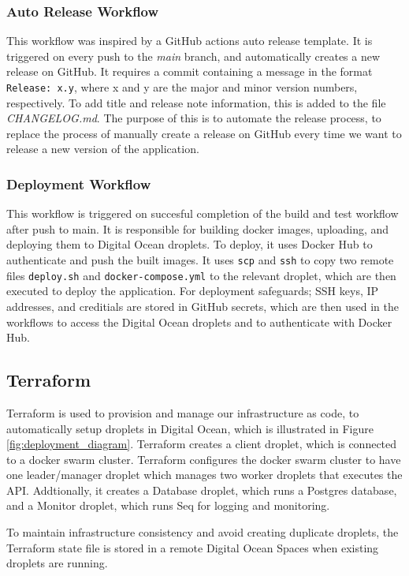 \subsubsection{Auto Release Workflow}
This workflow was inspired by a GitHub actions auto release template\cite{auto-release}.
It is triggered on every push to the \textit{main} branch, and automatically creates a new release on GitHub.
It requires a commit containing a message in the format \texttt{Release: x.y}, where x and y are the major and minor version numbers, respectively.
To add title and release note information, this is added to the file \textit{CHANGELOG.md}.
The purpose of this is to automate the release process, to replace the process of manually create a release on GitHub every time 
we want to release a new version of the application.

\subsubsection{Deployment Workflow}
This workflow is triggered on succesful completion of the build and test workflow after push to main.
It is responsible for building docker images, uploading, and deploying them to Digital Ocean droplets.
To deploy, it uses Docker Hub to authenticate and push the built images.
It uses \texttt{scp} and \texttt{ssh} to copy two remote files \texttt{deploy.sh} and \texttt{docker-compose.yml} to the relevant droplet,
which are then executed to deploy the application.
For deployment safeguards; SSH keys, IP addresses, and creditials are stored in GitHub secrets,
which are then used in the workflows to access the Digital Ocean droplets and to authenticate with Docker Hub.


\subsection{Terraform}
Terraform is used to provision and manage our infrastructure as code, 
to automatically setup droplets in Digital Ocean, which is illustrated 
in Figure \ref{fig:deployment_diagram}.
Terraform creates a client droplet, which is connected to a docker swarm cluster.
Terraform configures the docker swarm cluster to have one leader/manager droplet 
which manages two worker droplets that executes the API.
Addtionally, it creates a Database droplet, which runs a Postgres database,
and a Monitor droplet, which runs Seq for logging and monitoring.

To maintain infrastructure consistency and avoid creating duplicate droplets,
the Terraform state file is stored in a remote Digital Ocean Spaces when
existing droplets are running.

